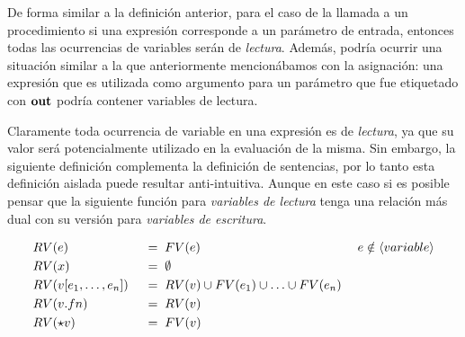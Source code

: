 
De forma similar a la definición anterior, para el caso de la llamada a un procedimiento si una expresión corresponde a un parámetro de entrada, entonces todas las ocurrencias de variables serán de \textit{lectura}. Además, podría ocurrir una situación similar a la que
anteriormente mencionábamos con la asignación: una expresión que es utilizada como argumento
para un parámetro que fue etiquetado con $\mathbf{out}$ podría contener variables de lectura.


Claramente toda ocurrencia de variable en una expresión es de \textit{lectura}, ya que su valor será potencialmente utilizado en la evaluación de la misma. Sin embargo, la siguiente
definición complementa la definición de sentencias, por lo tanto esta definición aislada puede resultar anti-intuitiva. Aunque en este caso si es posible pensar que la siguiente función para \textit{variables de lectura} tenga una relación más dual con su versión
para \textit{variables de escritura}.



\begin{alignat*}{3}
&RV(e)
&&\;=\;
FV(e)
&&\;e \notin \langle variable \rangle
\\
&RV(x)
&&\;=\;
\emptyset
\\
&RV(v [e_1, \ldots, e_n])
&&\;=\;
RV(v) \cup FV(e_1) \cup \ldots \cup FV(e_n)
\\
&RV(v.fn)
&&\;=\;
RV(v)
\\
&RV(\star v)
&&\;=\;
FV(v)
\end{alignat*}


